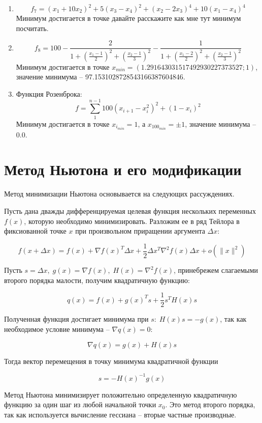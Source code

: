 \documentclass[12pt]{article}
\begin{document}
\begin{enumerate}
 	\item \[ f_7 = (x_1+10x_2)^2+5(x_3-x_4)^2+(x_2-2x_3)^4+10(x_1-x_4)^4 \]
 	Минимум достигается в точке давайте расскажите как мне тут минимум посчитать.

 	\item \[ f_8 = 100 - \frac{2}{1+\left( \frac{x_1-1}{2} \right) ^2 + \left( \frac{x_2-1}{3} \right) ^2} - \frac{1}{1+\left( \frac{x_1-2}{2} \right) ^2 + \left( \frac{x_2-1}{3} \right) ^2}\]
 	Минимум достигается в точке $x_{min} = (1.291643031517492930227373527; 1)$, значение минимума -- 97.1531028728543166387604846.

 	\item Функция Розенброка:
 	\[ f = \sum_1^{n-1} 100(x_{i+1}-x_i^2)^2+(1-x_i)^2 \]
 	Минимум достигается в точке $x_{i_{min}} = 1$, а $x_{{100}_{min}} = \pm 1$, значение минимума -- 0.0.
\end{enumerate}

\newpage
\section{Метод Ньютона и его модификации}

Метод минимизации Ньютона основывается на следующих рассуждениях.

Пусть дана дважды дифференцируемая целевая функция нескольких переменных $f(x)$, которую необходимо минимизировать. Разложим ее в ряд Тейлора в фиксиованной точке $x$ при произвольном приращении аргумента $\Delta x$:

\[ f(x+\Delta x) = f(x) + \nabla f(x)^T \Delta x + \frac{1}{2} \Delta x^T \nabla^2f(x)\Delta x + o(\lVert x \rVert ^ 2) \]

Пусть $s = \Delta x, \; g(x) = \nabla f(x), \; H(x) = \nabla^2 f(x)$, принебрежем слагаемыми второго порядка малости, получим квадратичную функцию:

\[ q(x) = f(x) + g(x)^Ts + \frac{1}{2} s^T H(x)s \]

Полученная функция достигает минимума при $s: \; H(x)s = -g(x)$, так как необходимое условие минимума -- $\nabla q(x) = 0$:

\[ \nabla q(x) = g(x)+H(x)s \]

Тогда вектор перемещения в точку минимума квадратичной функции

\[ s = -H(x)^{-1} g(x) \]

Метод Ньютона минимизирует положительно определенную квадратичную функцию за один шаг из любой начальной точки $x_0$. Это метод второго порядка, так как используется вычисление гессиана -- вторые частные производные.
\end{document}
